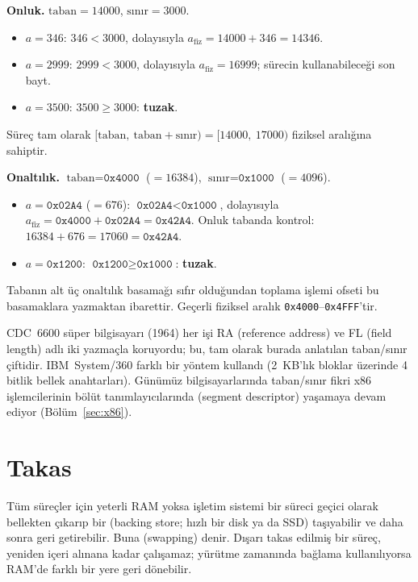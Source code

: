\begin{example}
\textbf{Onluk.} $\text{taban} = 14000$, $\text{sınır} = 3000$.
\begin{itemize}
  \item $a = 346$: $346 < 3000$, dolayısıyla $a_{\text{fiz}} = 14000 + 346 = 14346$.
  \item $a = 2999$: $2999 < 3000$, dolayısıyla $a_{\text{fiz}} = 16999$; sürecin kullanabileceği son bayt.
  \item $a = 3500$: $3500 \ge 3000$: \textbf{tuzak}.
\end{itemize}
Süreç tam olarak $[\text{taban},\ \text{taban}+\text{sınır}) = [14000,\ 17000)$ fiziksel aralığına sahiptir.

\textbf{Onaltılık.} $\text{taban} = \texttt{0x4000}$ ($=16384$), $\text{sınır} = \texttt{0x1000}$ ($=4096$).
\begin{itemize}
  \item $a = \texttt{0x02A4}$ ($=676$): $\texttt{0x02A4} < \texttt{0x1000}$, dolayısıyla $a_{\text{fiz}} = \texttt{0x4000} + \texttt{0x02A4} = \texttt{0x42A4}$. Onluk tabanda kontrol: $16384 + 676 = 17060 = \texttt{0x42A4}$.
  \item $a = \texttt{0x1200}$: $\texttt{0x1200} \ge \texttt{0x1000}$: \textbf{tuzak}.
\end{itemize}
Tabanın alt üç onaltılık basamağı sıfır olduğundan toplama işlemi ofseti bu basamaklara yazmaktan ibarettir. Geçerli fiziksel aralık \texttt{0x4000}--\texttt{0x4FFF}'tir.
\end{example}

\begin{histnote}
CDC~6600 süper bilgisayarı (1964) her işi RA (reference address) ve FL (field length) adlı iki yazmaçla koruyordu; bu, tam olarak burada anlatılan taban/sınır çiftidir. IBM~System/360 farklı bir yöntem kullandı (2~KB'lık bloklar üzerinde 4 bitlik bellek anahtarları). Günümüz bilgisayarlarında taban/sınır fikri x86 işlemcilerinin bölüt tanımlayıcılarında (segment descriptor) yaşamaya devam ediyor (Bölüm~\ref{sec:x86}).
\end{histnote}

\section{Takas}

Tüm süreçler için yeterli RAM yoksa işletim sistemi bir süreci geçici olarak bellekten çıkarıp bir  (backing store; hızlı bir disk ya da SSD) taşıyabilir ve daha sonra geri getirebilir. Buna  (swapping) denir. Dışarı takas edilmiş bir süreç, yeniden içeri alınana kadar çalışamaz; yürütme zamanında bağlama kullanılıyorsa RAM'de farklı bir yere geri dönebilir.

